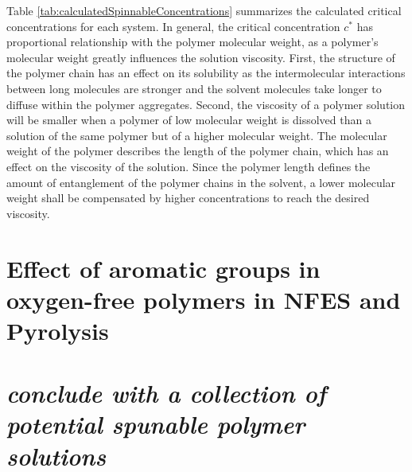 Table \ref{tab:calculatedSpinnableConcentrations} summarizes the calculated critical concentrations for each system. In general, the critical concentration $c^*$ has proportional relationship with the polymer molecular weight, as a polymer's molecular weight greatly influences the solution viscosity. First, the structure of the polymer chain has an effect on its solubility as the intermolecular interactions between long molecules are stronger and the solvent molecules take longer to diffuse within the polymer aggregates. \cite{Ramakrishna2005} Second, the viscosity of a polymer solution will be smaller when a polymer of low molecular weight is dissolved than a solution of the same polymer but of a higher molecular weight. \cite{Ramakrishna2005} The molecular weight of the polymer describes the length of the polymer chain, which has an effect on the viscosity of the solution. Since the polymer length defines the amount of entanglement of the polymer chains in the solvent, a lower molecular weight shall be compensated by higher concentrations to reach the desired viscosity.

\section{Effect of aromatic groups in oxygen-free polymers in NFES and Pyrolysis}



\section{\emph{conclude with a collection of potential spunable polymer solutions}}
